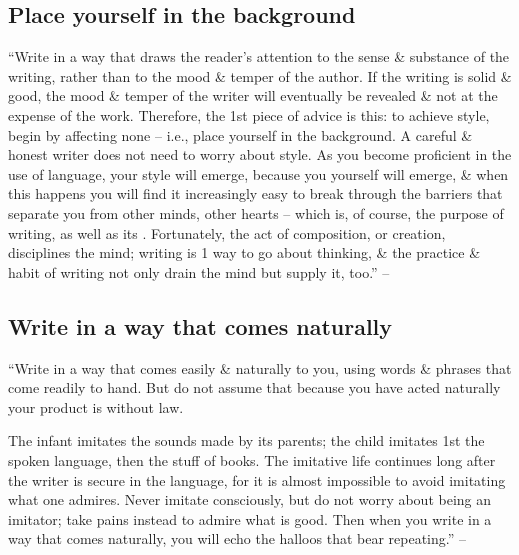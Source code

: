 \documentclass[oneside]{book}
\numberwithin{equation}{section}
\begin{document}
\subsection{Place yourself in the background}
``Write in a way that draws the reader's attention to the sense \& substance of the writing, rather than to the mood \& temper of the author. If the writing is solid \& good, the mood \& temper of the writer will eventually be revealed \& not at the expense of the work. Therefore, the 1st piece of advice is this: to achieve style, begin by affecting none -- i.e., place yourself in the background. A careful \& honest writer does not need to worry about style. As you become proficient in the use of language, your style will emerge, because you yourself will emerge, \& when this happens you will find it increasingly easy to break through the barriers that separate you from other minds, other hearts -- which is, of course, the purpose of writing, as well as its . Fortunately, the act of composition, or creation, disciplines the mind; writing is 1 way to go about thinking, \& the practice \& habit of writing not only drain the mind but supply it, too.'' -- \cite[Chap. 5, Sect. 1, p. 78]{Strunk_White2019}

\subsection{Write in a way that comes naturally}
``Write in a way that comes easily \& naturally to you, using words \& phrases that come readily to hand. But do not assume that because you have acted naturally your product is without law.

 The infant imitates the sounds made by its parents; the child imitates 1st the spoken language, then the stuff of books. The imitative life continues long after the writer is secure in the language, for it is almost impossible to avoid imitating what one admires. Never imitate consciously, but do not worry about being an imitator; take pains instead to admire what is good. Then when you write in a way that comes naturally, you will echo the halloos that bear repeating.''  -- \cite[Chap. 5, Sect. 2, p. 79]{Strunk_White2019}
\end{document}

